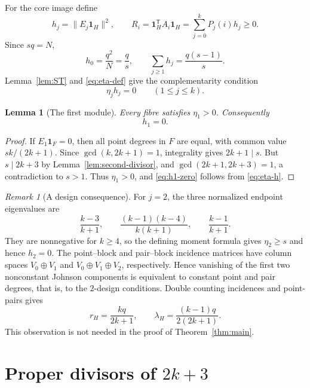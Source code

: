 \documentclass[11pt]{article}
\theoremstyle{plain}
\newtheorem{lemma}[theorem]{Lemma}
\theoremstyle{remark}
\newtheorem{remark}[theorem]{Remark}
\newcommand{\one}{\boldsymbol{1}}
\begin{document}
For the core image define
\begin{equation}\label{eq:hR}
 h_j=\|E_j\one_H\|^2,\qquad
 R_i=\one_H^{\mathsf T}A_i\one_H
     =\sum_{j=0}^kP_j(i)h_j\ge0.
\end{equation}
Since $sq=N$,
\begin{equation}\label{eq:h-masses}
 h_0=\frac{q^2}{N}=\frac qs,\qquad
 \sum_{j\ge1}h_j=\frac{q(s-1)}s.
\end{equation}
Lemma~\ref{lem:ST} and \eqref{eq:eta-def} give the complementarity
condition
\begin{equation}\label{eq:eta-h}
 \eta_jh_j=0\qquad(1\le j\le k).
\end{equation}

\begin{lemma}[The first module]\label{lem:first-module}
Every fibre satisfies $\eta_1>0$.  Consequently
\begin{equation}\label{eq:h1-zero}
 h_1=0.
\end{equation}
\end{lemma}

\begin{proof}
If $E_1\one_F=0$, then all point degrees in $F$ are equal, with common
value $sk/(2k+1)$.  Since $\gcd(k,2k+1)=1$, integrality gives
$2k+1\mid s$.  But $s\mid2k+3$ by Lemma~\ref{lem:second-divisor}, and
$\gcd(2k+1,2k+3)=1$, a contradiction to $s>1$.  Thus $\eta_1>0$, and
\eqref{eq:h1-zero} follows from \eqref{eq:eta-h}.
\end{proof}

\begin{remark}[A design consequence]\label{rem:design}
For $j=2$, the three normalized endpoint eigenvalues are
\[
 \frac{k-3}{k+1},\qquad
 \frac{(k-1)(k-4)}{k(k+1)},\qquad
 \frac{k-1}{k+1}.
\]
They are nonnegative for $k\ge4$, so the defining moment formula gives
$\eta_2\ge s$ and hence $h_2=0$.  The point--block and pair--block incidence
matrices have
column spaces $V_0\oplus V_1$ and
$V_0\oplus V_1\oplus V_2$, respectively.  Hence vanishing of the first two
nonconstant Johnson components is equivalent to constant point and pair
degrees, that is, to the $2$-design conditions.  Double counting incidences
and point-pairs gives
\[
 r_H=\frac{kq}{2k+1},\qquad
 \lambda_H=\frac{(k-1)q}{2(2k+1)}.
\]
This observation is not needed in the proof of Theorem~\ref{thm:main}.
\end{remark}

\section{Proper divisors of \texorpdfstring{$2k+3$}{2k+3}}\label{sec:proper}
\end{document}
